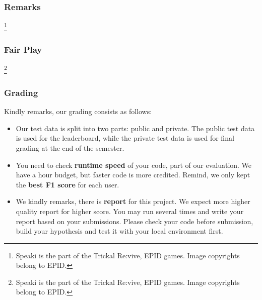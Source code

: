 \begin{frame}
    \frametitle{Remarks}

    \footnote{Speaki is the part of the Trickal Re:vive, EPID games. Image copyrights belong to EPID.}
\end{frame}

\begin{frame}
    \frametitle{Fair Play}

    \footnote{Speaki is the part of the Trickal Re:vive, EPID games. Image copyrights belong to EPID.}
\end{frame}

\begin{frame}
    \frametitle{Grading}

    Kindly remarks, our grading consists as follows:
    \begin{itemize}
        \item Our test data is split into two parts: public and private. The public test data is used for the leaderboard, while the private test data is used for final grading at the end of the semester.
        \item You need to check \textbf{runtime speed} of your code, part of our evaluation. We have a hour budget, but faster code is more credited. Remind, we only kept the \textbf{best F1 score} for each user.
        \item We kindly remarks, there is \textbf{report} for this project. We expect more higher quality report for higher score. You may run several times and write your report based on your submissions. Please check your code before submission, build your hypothesis and test it with your local environment first.
    \end{itemize}
\end{frame}